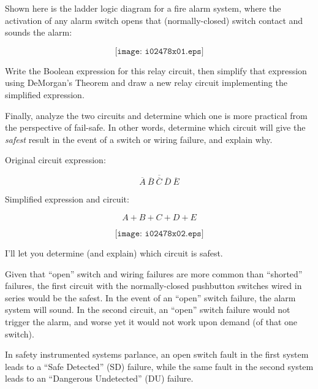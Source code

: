 

Shown here is the ladder logic diagram for a fire alarm system, where the activation of any alarm switch opens that (normally-closed) switch contact and sounds the alarm:

$$\texttt{[image: i02478x01.eps]}$$

Write the Boolean expression for this relay circuit, then simplify that expression using DeMorgan's Theorem and draw a new relay circuit implementing the simplified expression.

Finally, analyze the two circuits and determine which one is more practical from the perspective of fail-safe.  In other words, determine which circuit will give the {\it safest} result in the event of a switch or wiring failure, and explain why.







Original circuit expression:

$$\overline{ \overline{A} \> \overline{B} \> \overline{C} \> \overline{D} \> \overline{E} }$$

Simplified expression and circuit:

$$A + B + C + D + E$$

$$\texttt{[image: i02478x02.eps]}$$

\vskip 10pt

I'll let you determine (and explain) which circuit is safest.







Given that ``open'' switch and wiring failures are more common than ``shorted'' failures, the first circuit with the normally-closed pushbutton switches wired in series would be the safest.  In the event of an ``open'' switch failure, the alarm system will sound.  In the second circuit, an ``open'' switch failure would not trigger the alarm, and worse yet it would not work upon demand (of that one switch).

In safety instrumented systems parlance, an open switch fault in the first system leads to a ``Safe Detected'' (SD) failure, while the same fault in the second system leads to an ``Dangerous Undetected'' (DU) failure.

